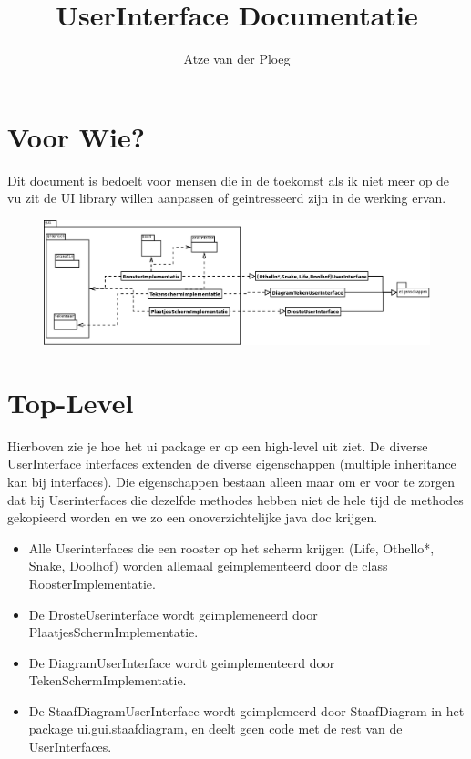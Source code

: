 \documentclass[a4paper,10pt]{article}
\title{UserInterface Documentatie}
\author{Atze van der Ploeg}
\begin{document}
\maketitle

\section{Voor Wie?}

Dit document is bedoelt voor mensen die in de toekomst als ik niet meer op de vu zit de UI library willen aanpassen of geintresseerd zijn in de werking ervan.

\begin{figure}
\begin{center}
 \includegraphics[width=1.3\linewidth]{Diagram1.png}
\end{center}

\end{figure}

\section{Top-Level}

Hierboven zie je hoe het ui package er op een high-level uit ziet. De diverse UserInterface interfaces extenden de diverse eigenschappen (multiple inheritance kan bij interfaces). Die eigenschappen bestaan alleen maar om er voor te zorgen dat bij Userinterfaces die dezelfde methodes hebben niet de hele tijd de methodes gekopieerd worden en we zo een onoverzichtelijke java doc krijgen. \\

\begin{itemize}

\item Alle Userinterfaces die een rooster op het scherm krijgen (Life, Othello*, Snake, Doolhof) worden allemaal geimplementeerd door de class RoosterImplementatie.
\item De DrosteUserinterface wordt geimplemeneerd door PlaatjesSchermImplementatie.
\item De DiagramUserInterface wordt geimplementeerd door TekenSchermImplementatie.
\item De StaafDiagramUserInterface wordt geimplemeerd door StaafDiagram in het package ui.gui.staafdiagram, en deelt geen code met de rest van de UserInterfaces.
\end{itemize}
\end{document}
